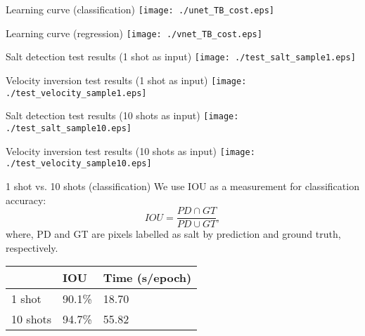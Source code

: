 \documentclass[aspectratio=169]{beamer}
\begin{document}
\begin{frame}{Learning curve (classification)}
    \center
    \texttt{[image: ./unet\_TB\_cost.eps]}
\end{frame}
\begin{frame}{Learning curve (regression)}
    \center
    \texttt{[image: ./vnet\_TB\_cost.eps]}
\end{frame}
\begin{frame}{Salt detection test results (1 shot as input)}
    \center
    \texttt{[image: ./test\_salt\_sample1.eps]}
\end{frame}
\begin{frame}{Velocity inversion test results (1 shot as input)}
    \center
    \texttt{[image: ./test\_velocity\_sample1.eps]}
\end{frame}
\begin{frame}{Salt detection test results (10 shots as input)}
    \center
    \texttt{[image: ./test\_salt\_sample10.eps]}
\end{frame}
\begin{frame}{Velocity inversion test results (10 shots as input)}
    \center
    \texttt{[image: ./test\_velocity\_sample10.eps]}
\end{frame}
\begin{frame}{}
\end{frame}
\begin{frame}{}
\end{frame}
\begin{frame}{1 shot vs. 10 shots (classification)}
\noindent 
We use IOU as a measurement for classification accuracy:
\begin{equation}
IOU=\frac{PD \cap GT}{PD \cup GT},
\end{equation}
where, PD and GT are pixels labelled as salt by prediction and ground truth, respectively.
\begin{table}[]
\centering
\label{Comparison}
\begin{tabular}{|l|l|l|}
\hline
         & IOU    & Time (s/epoch) \\ \hline
1 shot   & 90.1\% & 18.70          \\ \hline
10 shots & 94.7\% & 55.82          \\ \hline
\end{tabular}
\end{table}
\end{frame}
\end{document}
